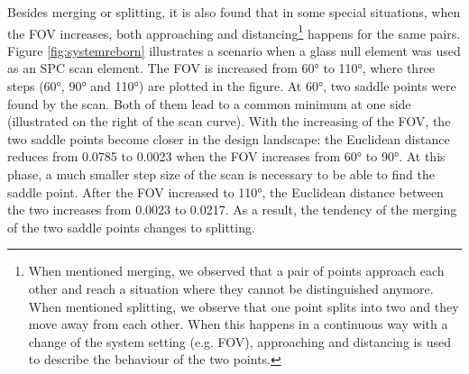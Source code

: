 Besides merging or splitting, it is also found that in some special situations, when the FOV increases, both approaching and distancing\footnote{When mentioned merging, we observed that a pair of points approach each other and reach a situation where they cannot be distinguished anymore. When mentioned splitting, we observe that one point splits into two and they move away from each other. When this happens in a continuous way with a change of the system setting (e.g. FOV), approaching and distancing is used to describe the behaviour of the two points.} happens for the same pairs. Figure \ref{fig:systemreborn} illustrates a scenario when a glass null element was used as an SPC scan element. The FOV is increased from 60° to 110°, where three steps (60°, 90° and 110°) are plotted in the figure. At 60°, two saddle points were found by the scan. Both of them lead to a common minimum at one side (illustrated on the right of the scan curve). With the increasing of the FOV, the two saddle points become closer in the design landscape: the Euclidean distance reduces from 0.0785 to 0.0023 when the FOV increases from 60° to 90°. At this phase, a much smaller step size of the scan is necessary to be able to find the saddle point. After the FOV increased to 110°, the Euclidean distance between the two increases from 0.0023 to 0.0217. As a result, the tendency of the merging of the two saddle points changes to splitting. 

